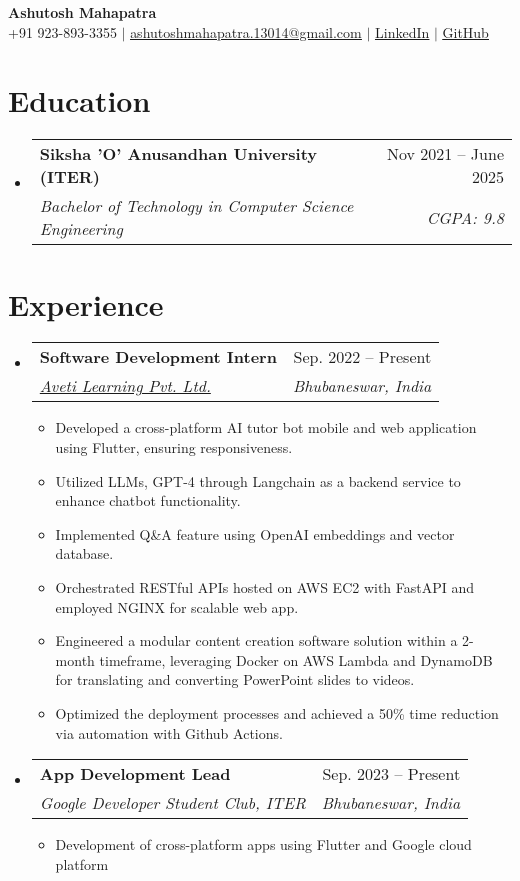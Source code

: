 \documentclass[letterpaper,11pt]{article}
\makeatletter
\newcommand{\resumeItem}[1]{
  \item\small{
    {#1 \vspace{-2pt}}
  }
}
\newcommand{\resumeSubheading}[4]{
  \vspace{2pt}\item
    \begin{tabular*}{0.97\textwidth}[t]{l@{\extracolsep{\fill}}r}
      \textbf{#1} & #2 \\
      \textit{\small#3} & \textit{\small #4} \\
    \end{tabular*}\vspace{-5pt}
}
\newcommand{\resumeSubHeadingListStart}{\begin{itemize}[leftmargin=0.15in, label={}]}
\newcommand{\resumeSubHeadingListEnd}{\vspace{-10pt}\end{itemize}}
\newcommand{\resumeItemListStart}{\begin{itemize}}
\newcommand{\resumeItemListEnd}{\end{itemize}\vspace{0pt}}
\makeatother
\begin{document}
\begin{center}
  \textbf{\Huge Ashutosh Mahapatra} \\ \vspace{5pt}
  \small +91 923-893-3355 $|$ \href{mailto:ashutoshmahapatra.13014@gmail.com}{\underline{ashutoshmahapatra.13014@gmail.com}} $|$
  \href{https://linkedin.com/in/ashutosh-mahapatra29/}{\underline{LinkedIn}} $|$
  \href{https://github.com/AM-ash-OR-AM-I}{\underline{GitHub}}
\end{center}


\section{Education}
\resumeSubHeadingListStart
\resumeSubheading
{Siksha 'O' Anusandhan University (ITER)}{Nov 2021 -- June 2025}
{Bachelor of Technology in Computer Science Engineering}{ CGPA: 9.8 }
\resumeSubHeadingListEnd


\section{Experience}
\resumeSubHeadingListStart
\resumeSubheading
{Software Development Intern}{Sep. 2022 -- Present}
{\href{https://avetilearning.com/}{Aveti Learning Pvt. Ltd.}}{Bhubaneswar, India}
\resumeItemListStart
\resumeItem{ Developed a cross-platform AI tutor bot mobile and web application using Flutter, ensuring responsiveness.}
\resumeItem{ Utilized LLMs, GPT-4 through Langchain as a backend service to enhance chatbot functionality.}
\resumeItem{ Implemented Q\&A feature using OpenAI embeddings and vector database.}
\resumeItem{ Orchestrated RESTful APIs hosted on AWS EC2 with FastAPI and employed NGINX for scalable web app.}
\resumeItem{Engineered a modular content creation software solution within a 2-month timeframe, leveraging Docker on AWS Lambda and DynamoDB for translating and converting PowerPoint slides to videos.}
\resumeItem{Optimized the deployment processes and achieved a 50\% time reduction via automation with Github Actions.}
\resumeItemListEnd
\resumeSubHeadingListEnd
\resumeSubHeadingListStart
\resumeSubheading
{App Development Lead}{Sep. 2023 -- Present}
{Google Developer Student Club, ITER} {Bhubaneswar, India}
\resumeItemListStart
\resumeItem { Development of cross-platform apps using Flutter and Google cloud platform}
\resumeItemListEnd
\resumeSubHeadingListEnd
\end{document}
